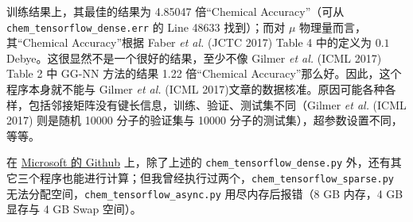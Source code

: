 \documentclass[10pt,a4paper,onecolumn]{article}
\numberwithin{equation}{section}
\begin{document}
训练结果上，其最佳的结果为 4.85047 倍“Chemical Accuracy”（可从 \verb|chem_tensorflow_dense.err| 的 Line 48633 找到）；而对 $ \mu $ 物理量而言，其“Chemical Accuracy”根据 Faber \emph{et al.} (JCTC 2017)\citep{Faber-Lilienfeld.JCTC.2017.13} Table 4 中的定义为 $ 0.1 $ Debye。这很显然不是一个很好的结果，至少不像 Gilmer \emph{et al.} (ICML 2017)\citep{Gilmer-Dahl.ICoML.2017.70} Table 2 中 GG-NN 方法的结果 1.22 倍“Chemical Accuracy”那么好。因此，这个程序本身就不能与 Gilmer \emph{et al.} (ICML 2017)\citep{Gilmer-Dahl.ICoML.2017.70}文章的数据核准。原因可能各种各样，包括邻接矩阵没有键长信息，训练、验证、测试集不同（Gilmer \emph{et al.} (ICML 2017)\citep{Gilmer-Dahl.ICoML.2017.70} 则是随机 10000 分子的验证集与 10000 分子的测试集），超参数设置不同，等等。

在 \href{https://github.com/Microsoft/gated-graph-neural-network-samples}{Microsoft 的 Github} 上，除了上述的 \verb|chem_tensorflow_dense.py| 外，还有其它三个程序也能进行计算；但我曾经执行过两个，\verb|chem_tensorflow_sparse.py| 无法分配空间，\verb|chem_tensorflow_async.py| 用尽内存后报错（8 GB 内存，4 GB 显存与 4 GB Swap 空间）。






\end{document}
